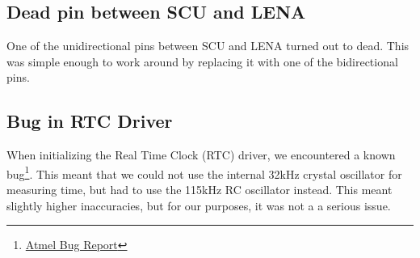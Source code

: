\subsection{Dead pin between SCU and LENA}
One of the unidirectional pins between SCU and LENA turned out to dead.
This was simple enough to work around by replacing it with one of the
bidirectional pins.

\subsection{Bug in RTC Driver}
When initializing the Real Time Clock (RTC) driver, we encountered a
known
bug\footnote{\href{http://asf.atmel.com/bugzilla/show_bug.cgi?id=10}{Atmel
Bug Report}}. This meant that we could not use the internal 32kHz
crystal oscillator for measuring time, but had to use the 115kHz RC
oscillator instead. This meant slightly higher inaccuracies, but for our
purposes, it was not a a serious issue.
